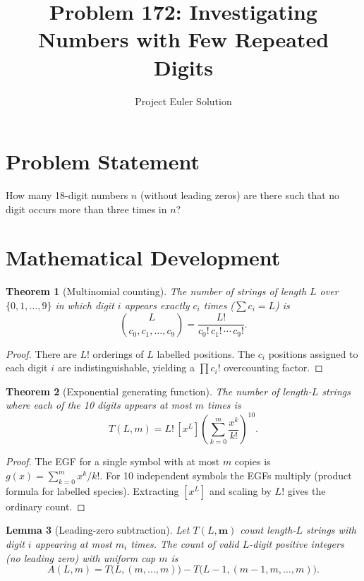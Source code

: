 \documentclass[11pt]{article}
\title{Problem 172: Investigating Numbers with Few Repeated Digits}
\author{Project Euler Solution}
\date{}
\newtheorem{theorem}{Theorem}
\newtheorem{lemma}[theorem]{Lemma}
\begin{document}
\maketitle

\section{Problem Statement}

How many 18-digit numbers $n$ (without leading zeros) are there such that no digit occurs more than three times in $n$?

\section{Mathematical Development}

\begin{theorem}[Multinomial counting]
The number of strings of length $L$ over $\{0,1,\ldots,9\}$ in which digit $i$ appears exactly $c_i$ times ($\sum c_i = L$) is
\[
\binom{L}{c_0,c_1,\ldots,c_9} = \frac{L!}{c_0!\,c_1!\,\cdots\,c_9!}.
\]
\end{theorem}

\begin{proof}
There are $L!$ orderings of $L$ labelled positions. The $c_i$ positions assigned to each digit $i$ are indistinguishable, yielding a $\prod c_i!$ overcounting factor.
\end{proof}

\begin{theorem}[Exponential generating function]
The number of length-$L$ strings where each of the 10 digits appears at most $m$ times is
\[
T(L,m) = L!\,[x^L]\left(\sum_{k=0}^{m}\frac{x^k}{k!}\right)^{\!10}.
\]
\end{theorem}

\begin{proof}
The EGF for a single symbol with at most $m$ copies is $g(x)=\sum_{k=0}^m x^k/k!$. For 10 independent symbols the EGFs multiply (product formula for labelled species). Extracting $[x^L]$ and scaling by $L!$ gives the ordinary count.
\end{proof}

\begin{lemma}[Leading-zero subtraction]
Let $T(L,\mathbf{m})$ count length-$L$ strings with digit $i$ appearing at most $m_i$ times. The count of valid $L$-digit positive integers (no leading zero) with uniform cap $m$ is
\[
A(L,m) = T\bigl(L,(m,\ldots,m)\bigr) - T\bigl(L{-}1,(m{-}1,m,\ldots,m)\bigr).
\]
\end{lemma}
\end{document}
